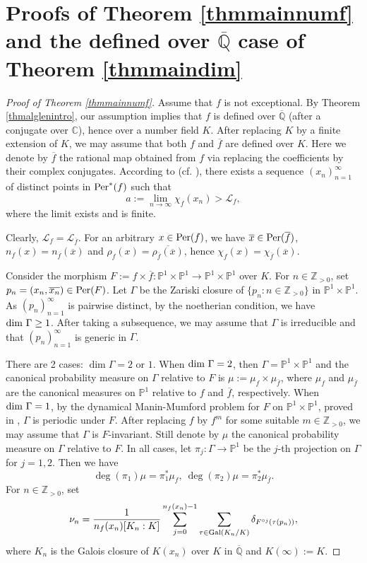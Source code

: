 \documentclass[12pt]{amsart}
\theoremstyle{plain}
\theoremstyle{remark}
\theoremstyle{definition}
\def\Z{\mathbb Z}
\def\Q{\mathbb Q}
\def\C{\mathbb C}
\def\P{\mathbb P}
\begin{document}
\section{Proofs of Theorem \ref{thmmainnumf} and the defined over $\overline{\Q}$ case of Theorem \ref{thmmaindim}}\label{section4}
\begin{proof}[Proof of Theorem \ref{thmmainnumf}]
Assume that $f$ is not exceptional. 
By Theorem \ref{thmalglenintro}, our assumption implies that $f$ is defined over $\overline{\Q}$ (after a conjugate over $\C$), hence over a number field $K$. After replacing $K$ by a finite extension of $K$, we may assume that both $f$ and $\overline{f}$ are defined over $K$. Here we denote by $\overline{f}$ the rational map obtained from $f$ via replacing the coefficients by their complex conjugates. According to \cite[Theorem 9 and Lemma 11]{Huguin2023} (cf. \cite{zdunik2014characteristic}), there exists a sequence $(x_n)_{n=1}^\infty$ of distinct points in ${\rm Per}^*(f)$ such that $$a:=\lim\limits_{n\to\infty}\chi_f(x_n)>\mathcal{L}_f,$$ where the limit exists and is finite.


Clearly, $\mathcal{L}_f=\mathcal{L}_{\overline{f}}$. For an arbitrary $x\in{\rm Per}(f)$, we have $\overline{x}\in{\rm Per}(\overline{f})$, $n_f(x)=n_{\overline{f}}(\overline{x})$ and $\rho_f(x)=\overline{\rho_{\overline{f}}(\overline{x})}$, hence $\chi_f(x)=\chi_{\overline{f}}(\overline{x})$.
	
	
Consider the morphism $F:=f\times\overline{f}:\P^1\times\P^1\to\P^1\times\P^1$ over $K$. For $n\in\Z_{>0}$, set $p_n=(x_n,\overline{x_n})\in{\rm Per}(F)$. Let $\Gamma$ be the Zariski closure of $\{p_n:n\in\Z_{>0}\}$ in $\P^1\times\P^1$. As $(p_n)_{n=1}^\infty$ is pairwise distinct, by the noetherian condition, we have ${\rm dim}\ \Gamma\geq1$. After taking a subsequence, we may assume that $\Gamma$ is irreducible and that $(p_n)_{n=1}^\infty$ is generic in $\Gamma$. 

There are 2 cases: $\dim \Gamma=2$ or $1$. When ${\rm dim}\ \Gamma=2$, then $\Gamma=\P^1\times\P^1$ and the canonical probability measure on $\Gamma$ relative to $F$ is $\mu:=\mu_f\times\mu_{\overline{f}}$, where $\mu_f$ and $\mu_{\overline{f}}$ are the canonical measures on $\P^1$ relative to $f$ and $\overline{f}$, respectively. When ${\rm dim}\ \Gamma=1$, by the dynamical Manin-Mumford problem for $F$ on $\P^1\times\P^1$, proved in \cite{Ghioca2011}, $\Gamma$ is periodic under $F$. After replacing $f$ by $f^m$ for some suitable $m\in\Z_{>0}$, we may assume that $\Gamma$ is $F$-invariant. Still denote by $\mu$ the canonical probability measure on $\Gamma$ relative to $F$. In all cases, let $\pi_j:\Gamma\to\P^1$ be the $j$-th projection on $\Gamma$ for $j=1,2$. Then we have 
$$\deg (\pi_1)\mu=\pi_1^*\mu_f,\ \deg (\pi_2)\mu=\pi_2^*\mu_{\overline{f}}.$$
For $n\in\Z_{>0}$, set $$\nu_n=\frac{1}{n_f(x_n)[K_n:K]}\sum_{j=0}^{n_f(x_n)-1}\sum_{\tau\in{\rm Gal}(K_n/K)}\delta_{F^{\circ j}(\tau(p_n))},$$ where $K_n$ is the Galois closure of $K(x_n)$ over $K$ in $\overline{\Q}$ and $K(\infty):=K$. 
	


\end{proof}
\end{document}
